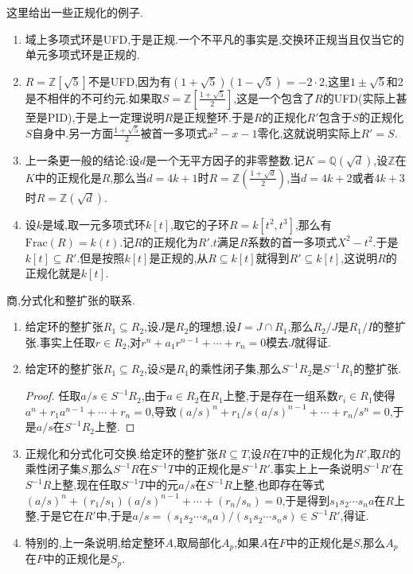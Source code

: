 这里给出一些正规化的例子.
\begin{enumerate}
	\item 域上多项式环是UFD,于是正规.一个不平凡的事实是,交换环正规当且仅当它的单元多项式环是正规的.
	\item $R=\mathbb{Z}[\sqrt{5}]$不是UFD,因为有$(1+\sqrt{5})(1-\sqrt{5})=-2\cdot2$,这里$1\pm\sqrt{5}$和2是不相伴的不可约元.如果取$S=\mathbb{Z}[\frac{1+\sqrt{5}}{2}]$,这是一个包含了$R$的UFD(实际上甚至是PID),于是上一定理说明$R$是正规整环.于是$R$的正规化$R'$包含于$S$的正规化$S$自身中.另一方面$\frac{1+\sqrt{5}}{2}$被首一多项式$x^2-x-1$零化,这就说明实际上$R'=S$.
	\item 上一条更一般的结论:设$d$是一个无平方因子的非零整数.记$K=\mathbb{Q}(\sqrt{d})$,设$\mathbb{Z}$在$K$中的正规化是$R$,那么当$d=4k+1$时$R=\mathbb{Z}(\frac{1+\sqrt{d}}{2})$,当$d=4k+2$或者$4k+3$时$R=\mathbb{Z}(\sqrt{d})$.
	\item 设$k$是域,取一元多项式环$k[t]$,取它的子环$R=k[t^2,t^3]$,那么有$\mathrm{Frac}(R)=k(t)$.记$R$的正规化为$R'$.$t$满足$R$系数的首一多项式$X^2-t^2$.于是$k[t]\subseteq R'$.但是按照$k[t]$是正规的,从$R\subseteq k[t]$就得到$R'\subseteq k[t]$,这说明$R$的正规化就是$k[t]$.
\end{enumerate}

商,分式化和整扩张的联系.
\begin{enumerate}
	\item 给定环的整扩张$R_1\subseteq R_2$,设$J$是$R_2$的理想,设$I=J\cap R_1$,那么$R_2/J$是$R_1/I$的整扩张.事实上任取$r\in R_2$,对$r^n+a_1r^{n-1}+\cdots+r_n=0$模去$J$就得证.
	\item 给定环的整扩张$R_1\subseteq R_2$,设$S$是$R_1$的乘性闭子集,那么$S^{-1}R_2$是$S^{-1}R_1$的整扩张.
	\begin{proof}
		
		任取$a/s\in S^{-1}R_2$,由于$a\in R_2$在$R_1$上整,于是存在一组系数$r_i\in R_1$使得$a^n+r_1a^{n-1}+\cdots+r_n=0$,导致$(a/s)^n+r_1/s(a/s)^{n-1}+\cdots+r_n/s^n=0$,于是$a/s$在$S^{-1}R_2$上整.
	\end{proof}
	\item 正规化和分式化可交换.给定环的整扩张$R\subseteq T$,设$R$在$T$中的正规化为$R'$,取$R$的乘性闭子集$S$,那么$S^{-1}R$在$S^{-1}T$中的正规化是$S^{-1}R'$.事实上上一条说明$S^{-1}R'$在$S^{-1}R$上整,现在任取$S^{-1}T$中的元$a/s$在$S^{-1}R$上整,也即存在等式$(a/s)^n+(r_1/s_1)(a/s)^{n-1}+\cdots+(r_n/s_n)=0$,于是得到$s_1s_2\cdots s_na$在$R$上整,于是它在$R'$中,于是$a/s=(s_1s_2\cdots s_na)/(s_1s_2\cdots s_ns)\in S^{-1}R'$,得证.
	\item 特别的,上一条说明,给定整环$A$,取局部化$A_p$,如果$A$在$F$中的正规化是$S$,那么$A_p$在$F$中的正规化是$S_p$.
\end{enumerate}

